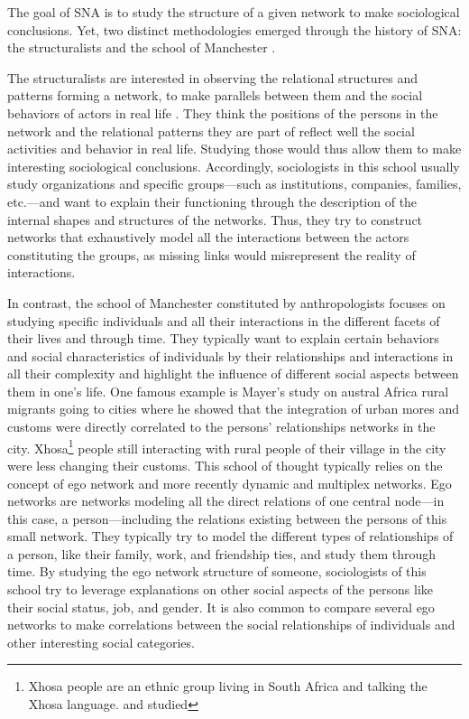 The goal of SNA is to study the structure of a given network to make sociological conclusions.
Yet, two distinct methodologies emerged through the history of SNA: the structuralists and the school of Manchester \cite{eveDeuxTraditionsAnalyse2002, maurizio2000, freemanDevelopmentSocialNetwork2004}.


The structuralists are interested in observing the relational structures and patterns forming a network, to make parallels between them and the social behaviors of actors in real life \cite{lazegaReseaux}.
They think the positions of the persons in the network and the relational patterns they are part of reflect well the social activities and behavior in real life.
Studying those would thus allow them to make interesting sociological conclusions.
Accordingly, sociologists in this school usually study organizations and specific groups---such as institutions, companies, families, etc.---and want to explain their functioning through the description of the internal shapes and structures of the networks.
Thus, they try to construct networks that exhaustively model all the interactions between the actors constituting the groups, as missing links would misrepresent the reality of interactions.

In contrast, the school of Manchester constituted by anthropologists focuses on studying specific individuals and all their interactions in the different facets of their lives and through time.
They typically want to explain certain behaviors and social characteristics of individuals by their relationships and interactions in all their complexity and highlight the influence of different social aspects between them in one's life.
One famous example is Mayer's study on austral Africa rural migrants going to cities \cite{mayerMigrancyStudyAfricans1962} where he showed that the integration of urban mores and customs were directly correlated to the persons' relationships networks in the city.
Xhosa\footnote{Xhosa people are an ethnic group living in South Africa and talking the Xhosa language. and studied} people still interacting with rural people of their village in the city were less changing their customs.
This school of thought typically relies on the concept of ego network and more recently dynamic and multiplex networks.
Ego networks are networks modeling all the direct relations of one central node---in this case, a person---including the relations existing between the persons of this small network.
They typically try to model the different types of relationships of a person, like their family, work, and friendship ties, and study them through time.
By studying the ego network structure of someone, sociologists of this school try to leverage explanations on other social aspects of the persons like their social status, job, and gender.
It is also common to compare several ego networks to make correlations between the social relationships of individuals and other interesting social categories.

